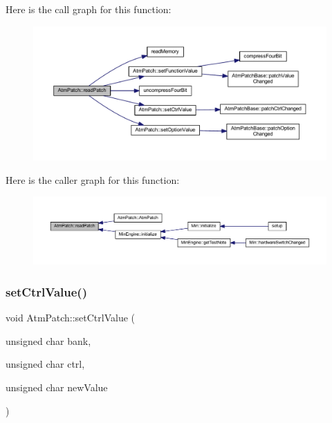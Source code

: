 Here is the call graph for this function\+:
\nopagebreak
\begin{figure}[H]
\begin{center}
\leavevmode
\includegraphics[width=350pt]{d9/de1/class_atm_patch_a9689db39f28d3c7d0fcaa6966c82e2d6_cgraph}
\end{center}
\end{figure}
Here is the caller graph for this function\+:
\nopagebreak
\begin{figure}[H]
\begin{center}
\leavevmode
\includegraphics[width=350pt]{d9/de1/class_atm_patch_a9689db39f28d3c7d0fcaa6966c82e2d6_icgraph}
\end{center}
\end{figure}
\mbox{\label{class_atm_patch_a95fb3ea0dfd3369abe7518da26edb1b5}} 
\subsubsection{\texorpdfstring{set\+Ctrl\+Value()}{setCtrlValue()}}
{\footnotesize\ttfamily void Atm\+Patch\+::set\+Ctrl\+Value (\begin{DoxyParamCaption}\item[{unsigned char}]{bank,  }\item[{unsigned char}]{ctrl,  }\item[{unsigned char}]{new\+Value }\end{DoxyParamCaption})}



